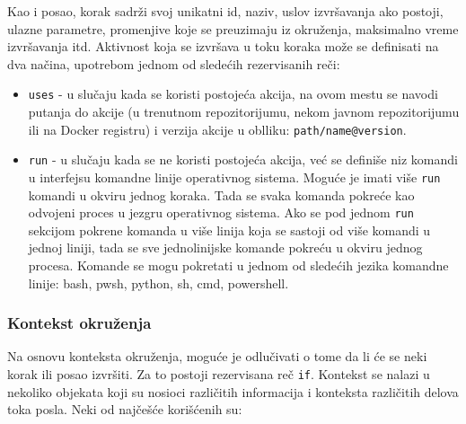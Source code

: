 \documentclass[12pt]{report}
\begin{document}
Kao i posao, korak sadrži svoj unikatni id, naziv, uslov izvršavanja ako postoji, ulazne parametre, promenjive koje se preuzimaju iz okruženja, maksimalno vreme izvršavanja itd. Aktivnost koja se izvršava u toku koraka može se definisati na dva načina, upotrebom jednom od sledećih rezervisanih reči:

\begin{itemize}
    \item\texttt{uses} - u slučaju kada se koristi postojeća akcija, na ovom mestu se navodi putanja do akcije (u trenutnom repozitorijumu, nekom javnom repozitorijumu ili na Docker registru) i verzija akcije u oblliku: \texttt{path/name@version}.
    \item\texttt{run} - u slučaju kada se ne koristi postojeća akcija, već se definiše niz komandi u interfejsu komandne linije operativnog sistema. Moguće je imati više \texttt{run} komandi u okviru jednog koraka. Tada se svaka komanda pokreće kao odvojeni proces u jezgru operativnog sistema. Ako se pod jednom \texttt{run} sekcijom pokrene komanda u više linija koja se sastoji od više komandi u jednoj liniji, tada se sve jednolinijske komande pokreću u okviru jednog procesa. Komande se mogu pokretati u jednom od sledećih jezika komandne linije: bash, pwsh, python, sh, cmd, powershell.
\end{itemize}

\subsubsection{Kontekst okruženja}
Na osnovu konteksta okruženja, moguće je odlučivati o tome da li će se neki korak ili posao izvršiti. Za to postoji rezervisana reč \texttt{if}. Kontekst se nalazi u nekoliko objekata koji su nosioci različitih informacija i konteksta različitih delova toka posla. Neki od najčešće korišćenih su:
\end{document}
